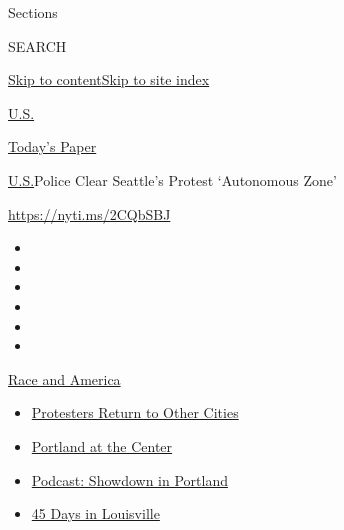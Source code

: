 Sections

SEARCH

\protect\hyperlink{site-content}{Skip to
content}\protect\hyperlink{site-index}{Skip to site index}

\href{https://www.nytimes.com/section/us}{U.S.}

\href{https://myaccount.nytimes.com/auth/login?response_type=cookie\&client_id=vi}{}

\href{https://www.nytimes.com/section/todayspaper}{Today's Paper}

\href{/section/us}{U.S.}\textbar{}Police Clear Seattle's Protest
`Autonomous Zone'

\url{https://nyti.ms/2CQbSBJ}

\begin{itemize}
\item
\item
\item
\item
\item
\item
\end{itemize}

\href{https://www.nytimes.com/news-event/george-floyd-protests-minneapolis-new-york-los-angeles?action=click\&pgtype=Article\&state=default\&region=TOP_BANNER\&context=storylines_menu}{Race
and America}

\begin{itemize}
\tightlist
\item
  \href{https://www.nytimes.com/2020/07/26/us/protests-portland-seattle-trump.html?action=click\&pgtype=Article\&state=default\&region=TOP_BANNER\&context=storylines_menu}{Protesters
  Return to Other Cities}
\item
  \href{https://www.nytimes.com/2020/07/24/us/portland-oregon-protests-white-race.html?action=click\&pgtype=Article\&state=default\&region=TOP_BANNER\&context=storylines_menu}{Portland
  at the Center}
\item
  \href{https://www.nytimes.com/2020/07/23/podcasts/the-daily/portland-protests.html?action=click\&pgtype=Article\&state=default\&region=TOP_BANNER\&context=storylines_menu}{Podcast:
  Showdown in Portland}
\item
  \href{https://www.nytimes.com/interactive/2020/07/16/us/black-lives-matter-protests-louisville-breonna-taylor.html?action=click\&pgtype=Article\&state=default\&region=TOP_BANNER\&context=storylines_menu}{45
  Days in Louisville}
\end{itemize}

